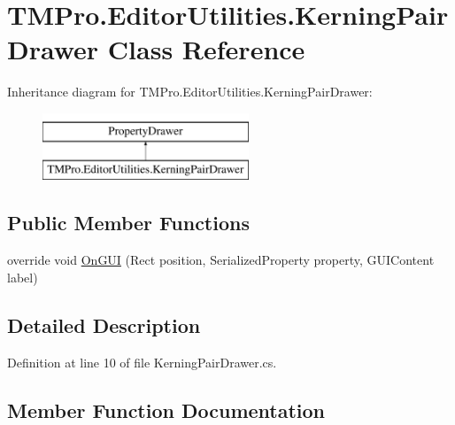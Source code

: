 \hypertarget{class_t_m_pro_1_1_editor_utilities_1_1_kerning_pair_drawer}{}\section{T\+M\+Pro.\+Editor\+Utilities.\+Kerning\+Pair\+Drawer Class Reference}
\label{class_t_m_pro_1_1_editor_utilities_1_1_kerning_pair_drawer}
Inheritance diagram for T\+M\+Pro.\+Editor\+Utilities.\+Kerning\+Pair\+Drawer\+:\begin{figure}[H]
\begin{center}
\leavevmode
\includegraphics[height=2.000000cm]{class_t_m_pro_1_1_editor_utilities_1_1_kerning_pair_drawer}
\end{center}
\end{figure}
\subsection*{Public Member Functions}
\begin{DoxyCompactItemize}
\item 
override void \mbox{\hyperlink{class_t_m_pro_1_1_editor_utilities_1_1_kerning_pair_drawer_ad08e30458554681755ef80e29dea72e9}{On\+G\+UI}} (Rect position, Serialized\+Property property, G\+U\+I\+Content label)
\end{DoxyCompactItemize}


\subsection{Detailed Description}


Definition at line 10 of file Kerning\+Pair\+Drawer.\+cs.



\subsection{Member Function Documentation}
\mbox{\label{class_t_m_pro_1_1_editor_utilities_1_1_kerning_pair_drawer_ad08e30458554681755ef80e29dea72e9}} 
